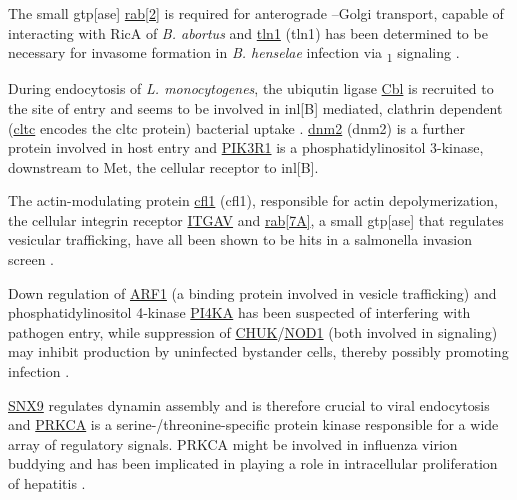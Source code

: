 \begin{description}[leftmargin=0.5cm]
\item[\textit{Bartonella}\slash \textit{Brucella}:] The small \acrshort{gtp}[ase] \hyperlink{tab:control-rab2}{\acrshort{rab}[2]} is required for anterograde --Golgi transport, capable of interacting with RicA of \textit{B. abortus} \citep{DeBarsy2011} and \hyperlink{tab:control-tln1}{\acrshort{tln1}} (\acrlong{tln1}) has been determined to be necessary for invasome formation in \textit{B. henselae} infection via \textbeta\textsubscript{1} signaling \citep{Truttmann2011}.
\item[\textit{Listeria}:] During endocytosis of \textit{L. monocytogenes}, the ubiqutin ligase \hyperlink{tab:control-CBL}{Cbl} is recruited to the site of entry and seems to be involved in \acrshort{inl}[B] mediated, clathrin dependent (\hyperlink{tab:control-cltc}{\acrshort{cltc}} encodes the \acrlong{cltc} protein) bacterial uptake \citep{Veiga2005}. \hyperlink{tab:control-dnm2}{\acrshort{dnm2}} (\acrlong{dnm2}) is a further protein involved in host entry and \hyperlink{tab:control-pik3r1}{PIK3R1} is a phosphatidylinositol 3-kinase, downstream to Met, the cellular receptor to \acrshort{inl}[B].
\item[\textit{Salmonella}:] The actin-modulating protein \hyperlink{tab:control-cfl1}{\acrshort{cfl1}} (\acrlong{cfl1}), responsible for actin depolymerization, the cellular integrin receptor \hyperlink{tab:control-itgav}{ITGAV} and \hyperlink{tab:control-rab7a}{\acrshort{rab}[7A]}, a small \acrshort{gtp}[ase] that regulates vesicular trafficking, have all been shown to be hits in a salmonella invasion screen \citep{Misselwitz2011}.
\item[\textit{Shigella}:] Down regulation of \hyperlink{tab:control-arf1}{ARF1} (a  binding protein involved in vesicle trafficking) and phosphatidylinositol 4-kinase \hyperlink{tab:control-pi4ka}{PI4KA} has been suspected of interfering with pathogen entry, while suppression of \hyperlink{tab:control-chuk}{CHUK}\slash \hyperlink{tab:control-nod1}{NOD1} (both involved in  signaling) may inhibit  production by uninfected bystander cells, thereby possibly promoting infection \citep{Kasper2012}. 
\item[Adenovirus\slash rhinovirus:] \hyperlink{tab:control-snx9}{SNX9} regulates dynamin assembly and is therefore crucial to viral endocytosis and \hyperlink{tab:control-prkca}{PRKCA} is a serine-\slash threonine-specific protein kinase responsible for a wide array of regulatory signals. PRKCA might be involved in influenza virion buddying and has been implicated in playing a role in intracellular proliferation of hepatitis \citep{Kanehisa2000}.

\end{description}

